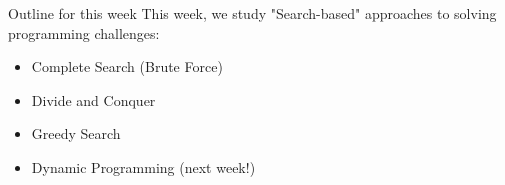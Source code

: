 \begin{frame}{Outline for this week}
  This week, we study "Search-based" approaches to solving programming challenges:
  \bigskip

  \begin{itemize}
    \item Complete Search (Brute Force)\bigskip

    \item Divide and Conquer\bigskip

    \item Greedy Search\bigskip

    \item Dynamic Programming (next week!)
  \end{itemize}
\end{frame}
